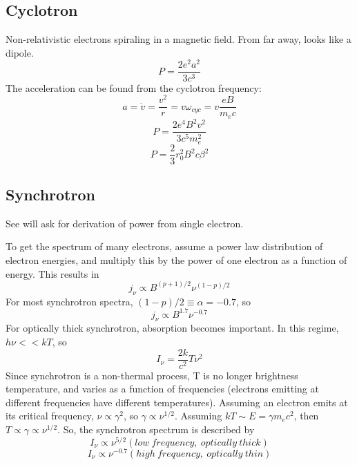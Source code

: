 \subsection{Cyclotron}
Non-relativistic electrons spiraling in a magnetic field.  From far away, looks like a dipole.  
\begin{displaymath}P=\frac{2e^2a^2}{3c^3}\end{displaymath}
The acceleration can be found from the cyclotron frequency:
\begin{displaymath}a=\dot{v}=\frac{v^2}{r}=v\omega_{cyc}=v\frac{eB}{m_ec}\end{displaymath}
\begin{displaymath}P=\frac{2e^4B^2v^2}{3c^5m_e^2}\end{displaymath}
\begin{displaymath}\boxed{P=\frac{2}{3}r_0^2B^2c\beta^2}\end{displaymath}

\subsection{Synchrotron}
See will ask for derivation of power from single electron.  

To get the spectrum of many electrons, assume a power law distribution of electron energies, and 
multiply this by the power of one electron as a function of energy.  This results in 
\begin{displaymath}j_{\nu}\propto B^{(p+1)/2}\nu^{(1-p)/2}\end{displaymath}
For most synchrotron spectra, $(1-p)/2\equiv \alpha=-0.7$, so
\begin{displaymath}j_{\nu}\propto B^{1.7}\nu^{-0.7}\end{displaymath}
For optically thick synchrotron, absorption becomes important.  In this regime, $h\nu<<kT$, so
\begin{displaymath}I_{\nu}=\frac{2k}{c^2}T\nu^2\end{displaymath}
Since synchrotron is a non-thermal process, T is no longer brightness temperature, and varies 
as a function of frequencies (electrons emitting at different frequencies have different 
temperatures).  Assuming an electron emits at its critical frequency, $\nu\propto\gamma^2$, so 
$\gamma\propto\nu^{1/2}$.  Assuming $kT\sim E=\gamma m_ec^2$, then 
$T\propto\gamma\propto\nu^{1/2}$.  So, the synchrotron spectrum is described by
\begin{displaymath}I_{\nu}\propto \nu^{5/2} (low\ frequency,\ optically\ thick)\end{displaymath}
\begin{displaymath}I_{\nu}\propto \nu^{-0.7} (high\ frequency,\ optically\ thin)\end{displaymath}


